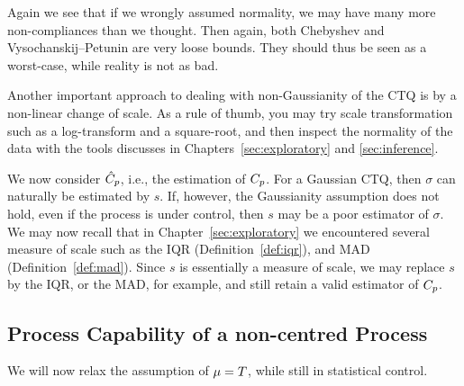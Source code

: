 


Again we see that if we wrongly assumed normality, we may have many more non-compliances than we thought. Then again, both Chebyshev and Vysochanskij–Petunin are very loose bounds. 
They should thus be seen as a worst-case, while reality is not as bad.







Another important approach to dealing with non-Gaussianity of the CTQ is by a non-linear change of scale.
As  a rule of thumb, you may try scale transformation such as a log-transform and a square-root, and then inspect the normality of the data with the tools discusses in Chapters~\ref{sec:exploratory} and \ref{sec:inference}.

We now consider $\hat{C}_p$, i.e., the estimation of $C_p$.
For a Gaussian CTQ, then $\sigma$ can naturally be estimated by $s$. 
If, however, the Gaussianity assumption does not hold, even if the process is under control, then $s$ may be a poor estimator of $\sigma$.
We may now recall that in Chapter~\ref{sec:exploratory} we encountered several measure of scale such as the IQR (Definition~\ref{def:iqr}), and MAD (Definition~\ref{def:mad}).
Since $s$ is essentially a measure of scale, we may replace $s$ by the IQR, or the MAD, for example, and still retain a valid estimator of $C_p$.








\subsection{Process Capability of a non-centred Process}
We will now relax the assumption of $\mu=T$, while still in statistical control.

